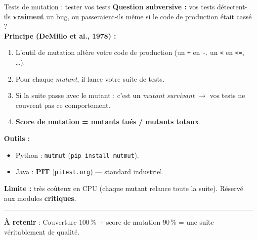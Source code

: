 \documentclass[aspectratio=169,11pt]{beamer}
\newcommand{\takeaway}[1]{%
\vfill\begin{beamercolorbox}[wd=\linewidth,sep=0.4em]{}
\color{accent2}\rule[0.6ex]{1.2em}{1.2pt}\hspace{0.4em}%
\textbf{\color{accent2}\small À retenir} \textcolor{textsoft}{:} %
{\small\color{textmain}#1}
\end{beamercolorbox}}
\begin{document}
\begin{frame}[t,shrink=10]{Tests de mutation : tester vos tests}
\footnotesize
\textbf{Question subversive :} vos tests détectent-ils \textbf{vraiment} un bug, ou passeraient-ils même si le code de production était cassé ?\\[0.4em]

\textbf{Principe (DeMillo et al., 1978) :}
\begin{enumerate}\itemsep0.05em
\item L'outil de mutation altère votre code de production (un \texttt{+} en \texttt{-}, un \texttt{<} en \texttt{<=}, \ldots).
\item Pour chaque \emph{mutant}, il lance votre suite de tests.
\item Si la suite passe avec le mutant : c'est un \emph{mutant survivant} $\to$ vos tests ne couvrent pas ce comportement.
\item \textbf{Score de mutation = mutants tués / mutants totaux}.
\end{enumerate}
\vspace{0.4cm}
\textbf{Outils :}
\begin{itemize}\itemsep0.05em
\item Python : \texttt{mutmut} (\texttt{pip install mutmut}).
\item Java : \textbf{PIT} (\texttt{pitest.org}) --- standard industriel.
\end{itemize}
\vspace{0.3cm}
\textbf{Limite :} très coûteux en CPU (chaque mutant relance toute la suite). Réservé aux modules \textbf{critiques}.
\takeaway{Couverture 100\,\% + score de mutation 90\,\% = une suite véritablement de qualité.}
\end{frame}
\end{document}
